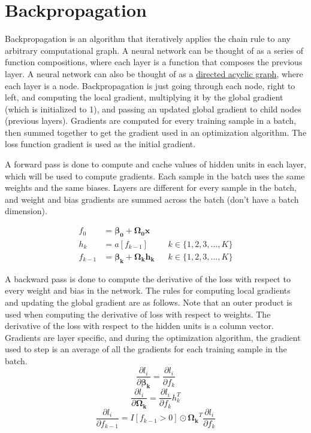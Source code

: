 \documentclass{article}
\begin{document}
\section{Backpropagation}
Backpropagation is an algorithm that iteratively applies the chain rule to any arbitrary computational graph. A neural network can be thought of as a series of function compositions, where each layer is a function that composes the previous layer. A neural network can also be thought of as a \href{https://www.youtube.com/watch?v=i94OvYb6noo}{directed acyclic graph}, where each layer is a node. Backpropagation is just going through each node, right to left, and computing the local gradient, multiplying it by the global gradient (which is initialized to 1), and passing an updated global gradient to child nodes (previous layers). Gradients are computed for every training sample in a batch, then summed together to get the gradient used in an optimization algorithm. The loss function gradient is used as the initial gradient.

A forward pass is done to compute and cache values of hidden units in each layer, which will be used to compute gradients. Each sample in the batch uses the same weights and the same biases.
Layers are different for every sample in the batch, and weight and bias gradients are summed across the batch (don't have a batch dimension).

\begin{align*}
f_0       &= \boldsymbol{\beta_0} + \boldsymbol{\Omega_0}\mathbf{x}\\
h_k       &= a[f_{k - 1}] && k \in \{1, 2, 3, \dots, K\}\\
f_{k - 1} &= \boldsymbol{\beta_k} + \boldsymbol{\Omega_k} \mathbf{h_k} && k \in \{1, 2, 3, \dots, K\}
\end{align*}

A backward pass is done to compute the derivative of the loss with respect to every weight and bias in the network. The rules for computing local gradients and updating the global gradient are as follows. Note that an outer product is used when computing the derivative of loss with respect to weights. The derivative of the loss with respect to the hidden units is a column vector. Gradients are layer specific, and during the optimization algorithm, the gradient used to step is an average of all the gradients for each training sample in the batch.
\[ \frac{\partial l_i}{\partial \boldsymbol{\beta_k}} = \frac{\partial l_i}{\partial f_k} \]
\[ \frac{\partial l_i}{\partial \boldsymbol{\Omega_k}} = \frac{\partial l_i}{\partial f_k} h_k^T \]
\[ \frac{\partial l_i}{\partial f_{k - 1}} = I[f_{k - 1} > 0] \odot \boldsymbol{\Omega_k}^T \frac{\partial l_i}{\partial f_k} \]
\end{document}
